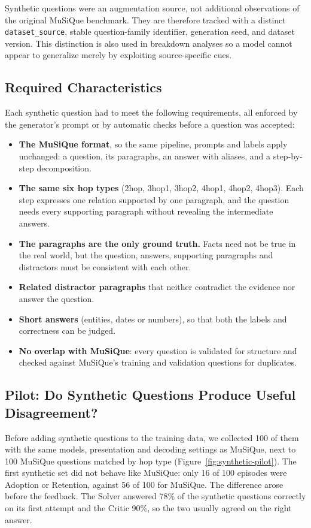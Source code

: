 Synthetic questions were an augmentation source, not additional observations
of the original MuSiQue benchmark. They are therefore tracked with a distinct
\texttt{dataset\_source}, stable question-family identifier, generation seed,
and dataset version. This distinction is also used in breakdown analyses so a
model cannot appear to generalize merely by exploiting source-specific cues.

\subsection{Required Characteristics}

Each synthetic question had to meet the following requirements, all enforced
by the generator's prompt or by automatic checks before a question was
accepted:
\begin{itemize}
    \item \textbf{The MuSiQue format}, so the same pipeline, prompts and
    labels apply unchanged: a question, its paragraphs, an answer with
    aliases, and a step-by-step decomposition.
    \item \textbf{The same six hop types} (2hop, 3hop1, 3hop2, 4hop1, 4hop2,
    4hop3). Each step expresses one relation supported by one paragraph, and
    the question needs every supporting paragraph without revealing the
    intermediate answers.
    \item \textbf{The paragraphs are the only ground truth.} Facts need not be
    true in the real world, but the question, answers, supporting paragraphs
    and distractors must be consistent with each other.
    \item \textbf{Related distractor paragraphs} that neither contradict the
    evidence nor answer the question.
    \item \textbf{Short answers} (entities, dates or numbers), so that both
    the labels and correctness can be judged.
    \item \textbf{No overlap with MuSiQue}: every question is validated for
    structure and checked against MuSiQue's training and validation questions
    for duplicates.
\end{itemize}

\subsection{Pilot: Do Synthetic Questions Produce Useful Disagreement?}

Before adding synthetic questions to the training data, we collected 100 of
them with the same models, presentation and decoding settings as MuSiQue,
next to 100 MuSiQue questions matched by hop type
(Figure~\ref{fig:synthetic-pilot}). The first synthetic set did not behave
like MuSiQue: only 16 of 100 episodes were Adoption or Retention, against 56
of 100 for MuSiQue. The difference arose before the feedback. The Solver
answered 78\% of the synthetic questions correctly on its first attempt and
the Critic 90\%, so the two usually agreed on the right answer.

